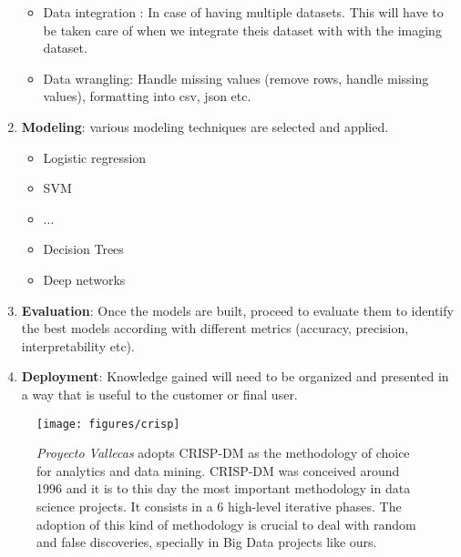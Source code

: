 \documentclass[11pt]{article}
\theoremstyle{definition}
\theoremstyle{remark}
\begin{document}
\begin{enumerate}
\begin{itemize}
		\item Data integration : In case of having multiple datasets. This will have to be taken care of when we integrate theis dataset with with the imaging dataset.
		\item Data wrangling: Handle missing values (remove rows, handle missing values), formatting into csv, json etc.
	\end{itemize}
\item \textbf{Modeling}: various modeling techniques are selected and applied.
	\begin{itemize}
		\item Logistic regression
		\item SVM
		\item ...
		\item Decision Trees
		\item Deep networks
	\end{itemize}
\item \textbf{Evaluation}: Once the models are built, proceed to evaluate them to identify the best models according with different metrics (accuracy, precision, interpretability etc).
\item \textbf{Deployment}: Knowledge gained will need to be organized and presented in a way that is useful to the customer or final user.
\end{enumerate}

\begin{figure}[H]
        \centering
        \texttt{[image: figures/crisp]}
        \caption{\emph{Proyecto Vallecas} adopts CRISP-DM \cite{crispdmwiki} as the methodology of choice for analytics and data mining. CRISP-DM was conceived around 1996 and it is to this day the most important methodology in data science projects. It consists in a 6 high-level iterative phases. The adoption of this kind of methodology is crucial to deal with random and false discoveries, specially in Big Data projects like ours.}\label{fig:crisp}
\end{figure}
\end{document}
